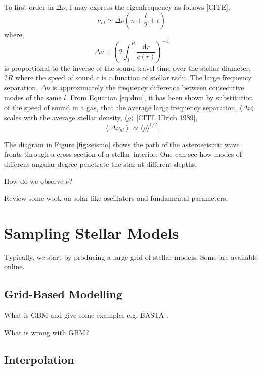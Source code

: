 To first order in $\Delta\nu$, I may express the eigenfrequency as follows [CITE],
%
\begin{equation}
    \nu_{nl} \simeq \Delta \nu\left(n+ \frac{l}{2} + \epsilon\right)
\end{equation}
%
where,
%
\begin{equation}
    \Delta \nu = \left(2 \int_{0}^{R} \frac{\mathrm{d} r}{c(r)}\right)^{-1}
    \label{eq:dnu}
\end{equation}
%
is proportional to the inverse of the sound travel time over the stellar diameter, $2R$ where the speed of sound $c$ is a function of stellar radii. The large frequency separation, $\Delta\nu$ is approximately the frequency difference between consecutive modes of the same $l$. From Equation \ref{eq:dnu}, it has been shown by substitution of the speed of sound in a gas, that the average large frequency separation, $\langle \Delta \nu \rangle$ scales with the average stellar density, $\langle\rho\rangle$ [CITE Ulrich 1989],
%
\begin{equation}
    \left\langle\Delta \nu_{n l}\right\rangle \propto \langle\rho\rangle^{1 / 2}.
\end{equation}
%

The diagram in Figure \ref{fig:seismo} shows the path of the asteroseismic wave fronts through a cross-section of a stellar interior. One can see how modes of different angular degree penetrate the star at different depths.

How do we observe $\nu$?

Review some work on solar-like oscillators and fundamental parameters.

\section{Sampling Stellar Models}

Typically, we start by producing a large grid of stellar models. Some are available online.

\subsection{Grid-Based Modelling}

What is GBM and give some examples e.g. BASTA \citet{SilvaAguirre.Davies.ea2015}.

What is wrong with GBM?

\subsection{Interpolation}

